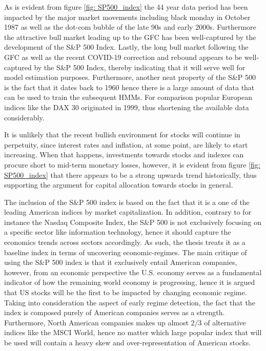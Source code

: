 As is evident from figure \ref{fig: SP500_index} the 44 year data period has been impacted by the major market movements including black monday in October 1987 as well as the dot-com bubble of the late 90s and early 2000s. Furthermore the attractive bull market leading up to the GFC has been well-captured by the development of the S\&P 500 Index. Lastly, the long bull market following the GFC as well as the recent COVID-19 correction and rebound appears to be well-captured by the S\&P 500 Index, thereby indicating that it will serve well for model estimation purposes. Furthermore, another neat property of the S\&P 500 is the fact that it dates back to 1960 hence there is a large amount of data that can be used to train the subsequent HMMs. For comparison popular European indices like the DAX 30 originated in 1999, thus shortening the available data considerably.   

It is unlikely that the recent bullish environment for stocks will continue in perpetuity, since interest rates and inflation, at some point, are likely to start increasing. When that happens, investments towards stocks and indexes can procure short to mid-term monetary losses, however, it is evident from figure \ref{fig: SP500_index} that there appears to be a strong upwards trend historically, thus supporting the argument for capital allocation towards stocks in general.

The inclusion of the S\&P 500 index is based on the fact that it is a one of the leading American indices by market capitalization. In addition, contrary to for instance the Nasdaq Composite Index, the S\&P 500 is not exclusively focusing on a specific sector like information technology, hence it should capture the economics trends across sectors accordingly. As such, the thesis treats it as a baseline index in terms of uncovering economic-regimes. The main critique of using the S\&P 500 index is that it exclusively entail American companies, however, from an economic perspective the U.S. economy serves as a fundamental indicator of how the remaining world economy is progressing, hence it is argued that US stocks will be the first to be impacted by changing economic regime. Taking into consideration the aspect of early regime detection, the fact that the index is composed purely of American companies serves as a strength. Furthermore, North American companies makes up almost 2/3 of alternative indices like the MSCI World, hence no matter which large popular index that will be used will contain a heavy skew and over-representation of American stocks.

